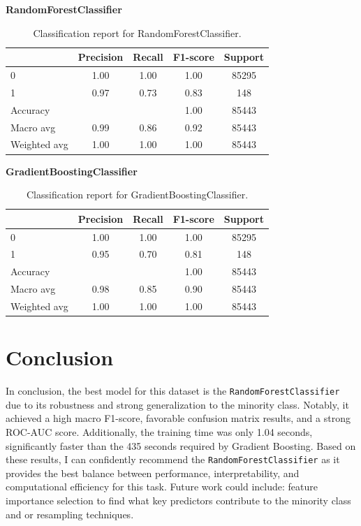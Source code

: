 \documentclass[12pt]{article}
\begin{document}
\begin{itemize}
\textbf{RandomForestClassifier}
\begin{table}[h!]
\centering
\begin{tabular}{lcccc}
\hline
 & Precision & Recall & F1-score & Support \\
\hline
0 & 1.00 & 1.00 & 1.00 & 85295 \\
1 & 0.97 & 0.73 & 0.83 & 148 \\
\hline
Accuracy & & & 1.00 & 85443 \\
Macro avg & 0.99 & 0.86 & 0.92 & 85443 \\
Weighted avg & 1.00 & 1.00 & 1.00 & 85443 \\
\hline
\end{tabular}
\caption{Classification report for RandomForestClassifier.}
\end{table}
\FloatBarrier %
\textbf{GradientBoostingClassifier}
\begin{table}[h!]
\centering
\begin{tabular}{lcccc}
\hline
 & Precision & Recall & F1-score & Support \\
\hline
0 & 1.00 & 1.00 & 1.00 & 85295 \\
1 & 0.95 & 0.70 & 0.81 & 148 \\
\hline
Accuracy & & & 1.00 & 85443 \\
Macro avg & 0.98 & 0.85 & 0.90 & 85443 \\
Weighted avg & 1.00 & 1.00 & 1.00 & 85443 \\
\hline
\end{tabular}
\caption{Classification report for GradientBoostingClassifier.}
\end{table}
\end{itemize}


\FloatBarrier %


\section{Conclusion}
In conclusion, the best model for this dataset is the \texttt{RandomForestClassifier} due to its robustness and strong generalization to the minority class. Notably, it achieved a high macro F1-score, favorable confusion matrix results, and a strong ROC-AUC score. Additionally, the training time was only 1.04 seconds, significantly faster than the 435 seconds required by Gradient Boosting. Based on these results, I can confidently recommend the \texttt{RandomForestClassifier} as it provides the best balance between performance, interpretability, and computational efficiency for this task. Future work could include: feature importance selection to find what key predictors contribute to the minority class and or resampling techniques.
\end{document}

